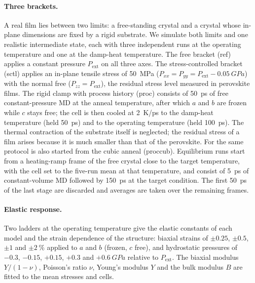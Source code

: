 \paragraph{Three brackets.}
A real film lies between two limits: a free-standing crystal and a crystal
whose in-plane dimensions are fixed by a rigid substrate. We simulate both
limits and one realistic intermediate state, each with three independent runs
at the operating temperature and one at the damp-heat temperature. The free
bracket (ref) applies a constant pressure $P_\mathrm{ext}$ on all three axes.
The stress-controlled bracket (sctl) applies an in-plane tensile stress of
\SI{50}{MPa} ($P_{xx} = P_{yy} = P_\mathrm{ext} - \SI{0.05}{GPa}$) with the
normal free ($P_{zz} = P_\mathrm{ext}$), the residual stress level measured in
perovskite films.\cite{Rolston2018AEM} The rigid clamp with process history
(proc) consists of \SI{50}{ps} of free constant-pressure MD at the anneal
temperature, after which $a$ and $b$ are frozen while $c$ stays free; the cell
is then cooled at \SI{2}{K/ps} to the damp-heat temperature (held
\SI{50}{ps}) and to the operating temperature (held \SI{100}{ps}). The thermal
contraction of the substrate itself is neglected; the residual stress of a
film arises because it is much smaller than that of the
perovskite.\cite{Rolston2018AEM, ref_processing_temp} For \CsSnI{} the same
protocol is also started from the cubic anneal (proccub).
Equilibrium runs start from a heating-ramp frame of the free crystal close to
the target temperature, with the cell set to the five-run mean at that
temperature, and consist of \SI{5}{ps} of constant-volume MD followed by
\SI{150}{ps} at the target condition. The first \SI{50}{ps} of the last stage
are discarded and averages are taken over the remaining frames.

\paragraph{Elastic response.}
Two ladders at the operating temperature give the elastic constants of each
model and the strain dependence of the structure: biaxial strains of $\pm0.25$,
$\pm0.5$, $\pm1$ and $\pm\SI{2}{\percent}$ applied to $a$ and $b$ (frozen,
$c$ free), and hydrostatic pressures of $-0.3$, $-0.15$, $+0.15$, $+0.3$ and
$+\SI{0.6}{GPa}$ relative to $P_\mathrm{ext}$. The biaxial modulus
$Y/(1-\nu)$, Poisson's ratio $\nu$, Young's modulus $Y$ and the bulk modulus
$B$ are fitted to the mean stresses and cells.

